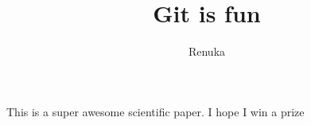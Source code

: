 \documentclass[10pt]{article}
\author{Renuka}
\title{Git is fun}
\begin{document}
	\maketitle

	This is a super awesome scientific paper.
	I hope I win a prize
\end{document}
